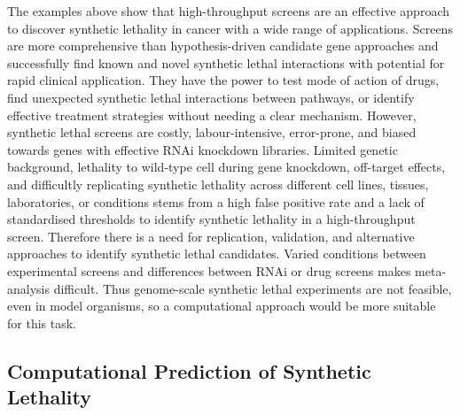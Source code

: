 The examples above show that high-throughput screens are an effective approach to discover synthetic lethality in cancer with a wide range of applications. Screens are more comprehensive than hypothesis-driven candidate gene approaches and successfully find known and novel synthetic lethal interactions with potential for rapid clinical application. They have the power to test mode of action of drugs, find unexpected synthetic lethal interactions between pathways, or identify effective treatment strategies without needing a clear mechanism. However, synthetic lethal screens are costly, labour-intensive, error-prone, and biased towards genes with effective RNAi knockdown libraries. Limited genetic background, lethality to wild-type cell during gene knockdown, off-target effects, and difficultly replicating synthetic lethality across different cell lines, tissues, laboratories, or conditions stems from a high false positive rate and a lack of standardised thresholds to identify synthetic lethality in a high-throughput screen. Therefore there is a need for replication, validation, and alternative approaches to identify synthetic lethal candidates. Varied conditions between experimental screens and differences between RNAi or drug screens makes meta-analysis difficult. Thus genome-scale synthetic lethal experiments are not feasible, even in model organisms, so a computational approach would be more suitable for this task.  

\subsection[Computational Prediction of Synthetic Lethality]{Computational Prediction of Synthetic Lethality}

